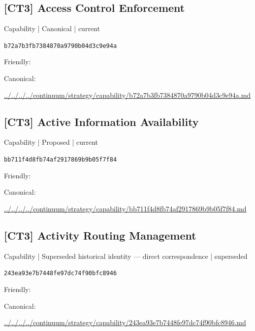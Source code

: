 \documentclass[10pt,a4paper]{article}
\begin{document}
\subsection*{[CT3] Access Control Enforcement}
{\small Capability | Canonical | current}\par
\texttt{b72a7b3fb7384870a9790b04d3c9e94a}\par
Friendly: \par
Canonical: \par
{\footnotesize\url{../../../../continuum/strategy/capability/b72a7b3fb7384870a9790b04d3c9e94a.md}}\par
\subsection*{[CT3] Active Information Availability}
{\small Capability | Proposed | current}\par
\texttt{bb711f4d8fb74af2917869b9b05f7f84}\par
Friendly: \par
Canonical: \par
{\footnotesize\url{../../../../continuum/strategy/capability/bb711f4d8fb74af2917869b9b05f7f84.md}}\par
\subsection*{[CT3] Activity Routing Management}
{\small Capability | Superseded historical identity — direct correspondence | superseded}\par
\texttt{243ea93e7b7448fe97dc74f90bfc8946}\par
Friendly: \par
Canonical: \par
{\footnotesize\url{../../../../continuum/strategy/capability/243ea93e7b7448fe97dc74f90bfc8946.md}}\par
\end{document}
